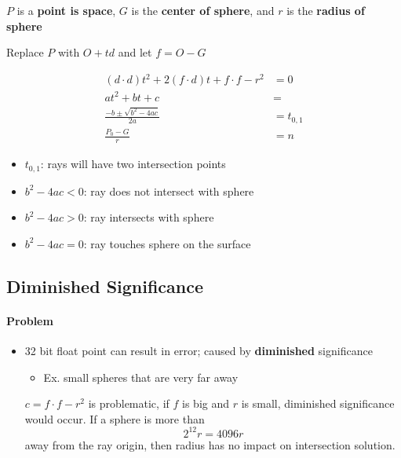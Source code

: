   $ P $ is a \textbf{point is space}, $ G $ is the \textbf{center of sphere},
  and $ r $ is the \textbf{radius of sphere}

  Replace $ P $ with $ O + td $ and let $ f = O - G  $

  \begin{align}
    \left( d \cdot d \right) t^{2}
      + 2 \left( f \cdot d \right) t
      + f \cdot f - r^{2}
    &= 0 \\
    a t^{2} + bt + c &= \\
    \frac{-b \pm \sqrt{b^{2} - 4ac}}{2a} &= t_{0, 1} \\
    \frac{P_{0} - G}{r} &= n
  \end{align}

  \begin{itemize}
    \item $ t_{0, 1} $: rays will have two intersection points
    \item $ b^{2} - 4ac < 0 $: ray does not intersect with sphere
    \item $ b^{2} - 4ac > 0 $: ray intersects with sphere
    \item $ b^{2} - 4ac = 0 $: ray touches sphere on the surface
  \end{itemize}

  \subsection{Diminished Significance}

    \paragraph{Problem}
    \begin{itemize}
      \item 32 bit float point can result in error; caused by
      \textbf{diminished} significance
      \begin{itemize}
        \item Ex. small spheres that are very far away
      \end{itemize}

      $ c = f \cdot f - r^{2}  $ is problematic, if $ f $ is big and $ r $ is
      small, diminished significance would occur. If a sphere is more than
      \begin{equation}
        2^{12} r = 4096 r
      \end{equation}
      away from the ray origin, then radius has no impact on intersection
      solution.
    \end{itemize}

